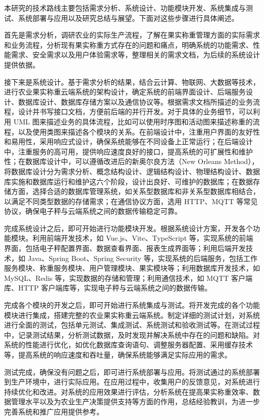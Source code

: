 \documentclass{xduugthesis}
\begin{document}
本研究的技术路线主要包括需求分析、系统设计、功能模块开发、系统集成与测试、系统部署与应用以及研究总结与展望。下面对这些步骤进行具体阐述。

首先是需求分析，调研农业的实际生产流程，了解在果实称重管理方面的实际需求和业务流程，分析现有果实称重方式存在的问题和痛点，明确系统的功能需求、性能需求、安全需求以及用户体验需求等，整理相关的需求文档，为后续的系统设计提供依据。

接下来是系统设计。基于需求分析的结果，结合云计算、物联网、大数据等技术，进行农业果实称重云端系统的架构设计，确定系统的前端界面设计、后端服务设计、数据库设计、数据库存储方案以及通信协议等。根据需求文档所描述的业务流程，设计并书写接口文档，方便前后端的并行开发。对于具体的业务细节，可以利用 UML 图来描述业务的具体流程，比如可以使用时序图和活动图来描述称重的流程，以及使用类图来描述各个模块的关系。在前端设计中，注重用户界面的友好性和易用性，采用响应式设计，确保系统能够在不同设备上正常运行；在后端设计中，注重服务的高可用，提供响应速度良好的接口，提高系统的可扩展性和维护性；在数据库设计中，可以遵循改进后的新奥尔良方法（New Orleans Method），将数据库设计分为需求分析、概念结构设计、逻辑结构设计、物理结构设计、数据库实施和数据库运行和维护这六个阶段，设计出良好、可维护的数据库\cite{苗雪兰2001数据库系统原理及应用教程}；在数据存储方面，选择合适的数据库管理系统，如关系型数据库和非关系型数据库相结合，以满足不同类型数据的存储需求；在通信协议方面，选用 HTTP、MQTT 等常见协议，确保电子秤与云端系统之间的数据传输稳定可靠。

完成系统设计之后，即可开始进行功能模块开发。根据系统设计方案，开发各个功能模块。利用前端开发技术，如 Vue.js、Vite、TypeScript 等，实现系统的前端界面，包括电子秤配置界面、数据查看界面、报表生成界面等；利用后端开发技术，如 Java、Spring Boot、Spring Security 等，实现系统的后端服务，包括工作服务模块、称重服务模块、用户管理模块、果实模块等；利用数据库开发技术，如 MySQL、Redis 等，实现数据的存储和管理；利用通信技术，如 MQTT 客户端库、HTTP 客户端库等，实现电子秤与云端系统之间的数据传输。

完成各个模块的开发之后，即可开始进行系统集成与测试。将开发完成的各个功能模块进行集成，搭建完整的农业果实称重云端系统。制定详细的测试计划，对系统进行全面的测试，包括单元测试、集成测试、系统测试和验收测试等。在测试过程中，记录测试结果，分析测试数据，及时发现并解决系统中存在的问题和缺陷。对系统的性能进行优化，如优化数据库查询语句、调整服务器配置、采用缓存技术等，提高系统的响应速度和吞吐量，确保系统能够满足实际应用的需求。

测试完成，确保没有问题之后，即可进行系统部署与应用。将测试通过的系统部署到生产环境中，进行实际应用。在应用过程中，收集用户的反馈意见，对系统进行持续优化和改进。对系统的应用效果进行评估，分析系统在提高果实称重效率、数据管理水平以及为农业生产决策提供支持等方面的作用，总结经验教训，为进一步完善系统和推广应用提供参考。
\end{document}
